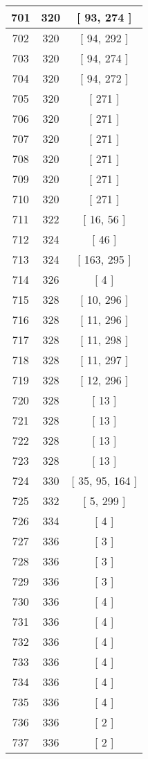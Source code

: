 \begin{center}
\begin{longtable}[H]{|| c c c ||}
\hline
701 & 320 & [ 93, 274 ] \\ 
\hline
702 & 320 & [ 94, 292 ] \\ 
\hline
703 & 320 & [ 94, 274 ] \\ 
\hline
704 & 320 & [ 94, 272 ] \\ 
\hline
705 & 320 & [ 271 ] \\ 
\hline
706 & 320 & [ 271 ] \\ 
\hline
707 & 320 & [ 271 ] \\ 
\hline
708 & 320 & [ 271 ] \\ 
\hline
709 & 320 & [ 271 ] \\ 
\hline
710 & 320 & [ 271 ] \\ 
\hline
711 & 322 & [ 16, 56 ] \\ 
\hline
712 & 324 & [ 46 ] \\ 
\hline
713 & 324 & [ 163, 295 ] \\ 
\hline
714 & 326 & [ 4 ] \\ 
\hline
715 & 328 & [ 10, 296 ] \\ 
\hline
716 & 328 & [ 11, 296 ] \\ 
\hline
717 & 328 & [ 11, 298 ] \\ 
\hline
718 & 328 & [ 11, 297 ] \\ 
\hline
719 & 328 & [ 12, 296 ] \\ 
\hline
720 & 328 & [ 13 ] \\ 
\hline
721 & 328 & [ 13 ] \\ 
\hline
722 & 328 & [ 13 ] \\ 
\hline
723 & 328 & [ 13 ] \\ 
\hline
724 & 330 & [ 35, 95, 164 ] \\ 
\hline
725 & 332 & [ 5, 299 ] \\ 
\hline
726 & 334 & [ 4 ] \\ 
\hline
727 & 336 & [ 3 ] \\ 
\hline
728 & 336 & [ 3 ] \\ 
\hline
729 & 336 & [ 3 ] \\ 
\hline
730 & 336 & [ 4 ] \\ 
\hline
731 & 336 & [ 4 ] \\ 
\hline
732 & 336 & [ 4 ] \\ 
\hline
733 & 336 & [ 4 ] \\ 
\hline
734 & 336 & [ 4 ] \\ 
\hline
735 & 336 & [ 4 ] \\ 
\hline
736 & 336 & [ 2 ] \\ 
\hline
737 & 336 & [ 2 ] \\ 

\end{longtable}
\end{center}

